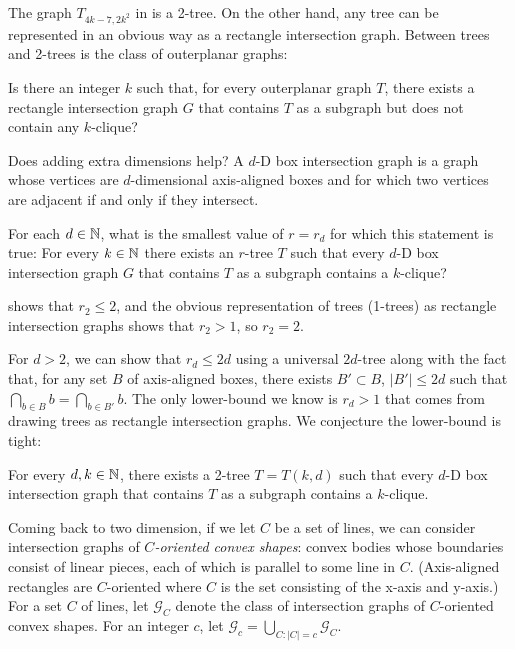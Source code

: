 \documentclass[lotsofwhite]{patmorin}
\begin{document}
The graph $T_{4k-7,2k^2}$ in  is a 2-tree.
On the other hand, any tree can be represented in an obvious way as a
rectangle intersection graph.  Between trees and 2-trees is the class
of outerplanar graphs:

\begin{op}
  Is there an integer $k$ such that, for every outerplanar graph $T$, there
  exists a rectangle intersection graph $G$ that contains $T$ as a subgraph
  but does not contain any $k$-clique?
\end{op}

Does adding extra dimensions help?  A $d$-D box intersection graph is
a graph whose vertices are $d$-dimensional axis-aligned boxes and for
which two vertices are adjacent if and only if they intersect.

\begin{op}
   For each $d\in\mathbb{N}$, what is the smallest value of $r=r_d$ for which this
   statement is true: For every $k\in\mathbb{N}$ there exists an $r$-tree $T$
   such that every $d$-D box intersection graph $G$ that contains $T$
   as a subgraph contains a $k$-clique?
\end{op}

 shows that $r_2 \le 2$, and the obvious
representation of trees (1-trees) as rectangle intersection graphs shows
that $r_2> 1$, so $r_2=2$.

For $d>2$, we can show that $r_d \le 2d$ using a universal $2d$-tree along
with the fact that, for any set $B$ of axis-aligned boxes, there exists
$B'\subset B$, $|B'|\le 2d$ such that $\bigcap_{b\in B}b=\bigcap_{b\in
B'}b$.  The only lower-bound we know is $r_d> 1$ that comes from drawing
trees as rectangle intersection graphs.  We conjecture the lower-bound
is tight:

\begin{conj}
   For every $d,k\in\mathbb{N}$, there exists a 2-tree $T=T(k,d)$ such that
   every $d$-D box intersection graph that contains $T$ as a subgraph
   contains a $k$-clique.
\end{conj}

Coming back to two dimension, if we let $C$ be a set of lines, we
can consider intersection graphs of \emph{$C$-oriented convex shapes}:
convex bodies whose boundaries consist of linear pieces, each of which is
parallel to some line in $C$.  (Axis-aligned rectangles are $C$-oriented
where $C$ is the set consisting of the x-axis and y-axis.)  For a set $C$
of lines, let $\mathcal{G}_C$ denote the class of intersection graphs
of $C$-oriented convex shapes.  For an integer $c$, let $\mathcal{G}_c=\bigcup_{C:|C|=c}\mathcal{G}_C$.
\end{document}
